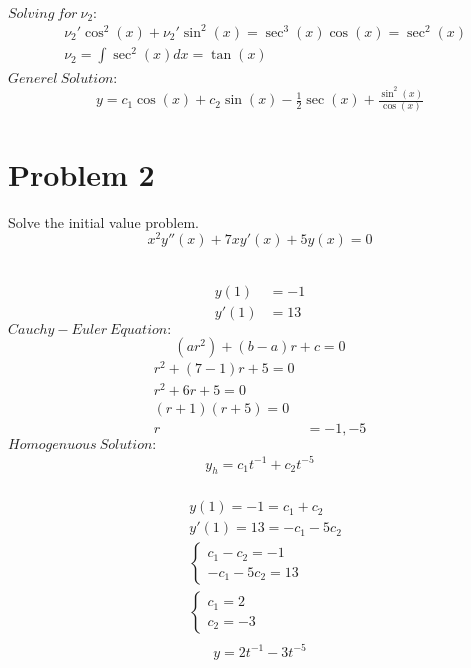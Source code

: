 \documentclass{article}
\begin{document}
    $Solving\ for\ \nu_2:$ \\   
    \begin{align*}
        &\nu_2'\cos^{2}(x) + \nu_2'\sin^{2}(x) = \sec^{3}(x)\cos(x) = \sec^{2}(x)\\
        &\nu_2 = \int \sec^{2}(x)dx = \tan(x) \\
    \end{align*}
    $Generel\ Solution:$ \\
    \begin{align*}
        y = c_{1}\cos(x) + c_{2}\sin(x) - \frac{1}{2}\sec(x) + \frac{\sin^{2}(x)}{\cos(x)}
    \end{align*}

    \newpage
    \section{Problem 2}

    \begin{flushleft}
        Solve the initial value problem. \\
        $$x^{2}y''(x) + 7xy'(x) + 5y(x) = 0$$
    \end{flushleft} 
     \\
    \begin{align*}
        y(1) &= -1 \\
        y'(1) &= 13
    \end{align*}
    $Cauchy-Euler\ Equation:$ \\
    $$(ar^2) + (b - a)r + c = 0$$
    \begin{align*}
        r^{2} + (7 - 1)r + 5 = 0 \\
        r^{2} + 6r + 5 = 0 \\
        (r + 1)(r + 5) = 0 \\
        r &= -1, -5
    \end{align*}
    $Homogenuous\ Solution:$ \\
    \begin{align*}
        y_h = c_{1}t^{-1} + c_{2}t^{-5}
    \end{align*}
     \\
    \begin{align*}
        &y(1) = -1 = c_{1} + c_{2} \\
        &y'(1) = 13 = -c_{1} - 5c_{2} \\
        &\begin{cases}
            c_{1} - c_{2} = -1 \\
            -c_{1} - 5c_{2} = 13
        \end{cases} \\
        &\begin{cases}
            c_{1} = 2 \\
            c_{2} = -3
        \end{cases} \\
    \end{align*}
    $$y = 2t^{-1} - 3t^{-5}$$
\end{document}
